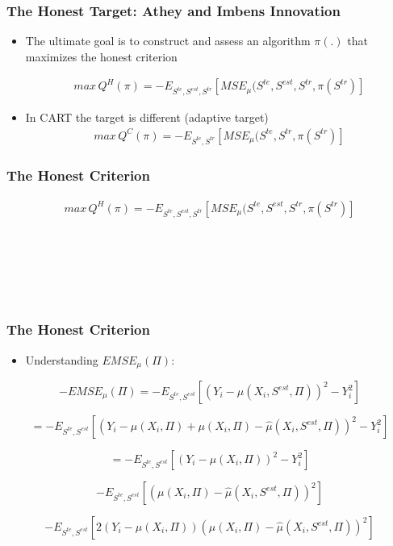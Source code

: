 \documentclass[
  shownotes,
  xcolor={svgnames},
  hyperref={colorlinks,citecolor=DarkBlue,linkcolor=DarkRed,urlcolor=DarkBlue}
  , aspectratio=169]{beamer}
\begin{document}
\begin{frame}[fragile]
\frametitle{The Honest Target: Athey and Imbens Innovation}


\begin{itemize}
\item The ultimate goal is to construct and assess an algorithm $\pi(.)$ that maximizes the honest criterion

\medskip
\begin{align}
max\,Q^{H}(\pi)=-E_{S^{te},S^{est},S^{tr}}\left[MSE_{\mu}(S^{te},S^{est},S^{tr},\pi(S^{tr})\right]
\end{align}


\item In CART the target is different (adaptive target)
\medskip
\begin{align}
max\,Q^{C}(\pi)=-E_{S^{te},S^{tr}}\left[MSE_{\mu}(S^{te},S^{tr},\pi(S^{tr})\right]
\end{align}


\end{itemize}
\end{frame}
\begin{frame}[fragile]
\frametitle{The Honest Criterion}

\begin{align}
max\,Q^{H}(\pi)=-E_{S^{te},S^{est},S^{tr}}\left[MSE_{\mu}(S^{te},S^{est},S^{tr},\pi(S^{tr})\right]
\end{align}
\bigskip

$\,$ \\
\bigskip

$\,$\\
\bigskip

$\,$\\
\bigskip
\end{frame}
\begin{frame}[fragile]
\frametitle{The Honest Criterion}

\begin{itemize}
  \item Understanding $EMSE_{\mu}(\Pi)$:
\end{itemize}
\begin{equation}
-EMSE_{\mu}(\Pi)=-E_{S^{te},S^{est}}\left[\left(Y_{i}-\hat{\mu}(X_{i},S^{est},\Pi)\right)^{2}-Y_{i}^{2}\right]
\end{equation}

\[
=-E_{S^{te},S^{est}}\left[\left(Y_{i}-\mu(X_{i},\Pi)+\mu(X_{i},\Pi)-\hat{\mu}(X_{i},S^{est},\Pi)\right)^{2}-Y_{i}^{2}\right]
\]

\[
=-E_{S^{te},S^{est}}\left[\left(Y_{i}-\mu(X_{i},\Pi)\right)^{2}-Y_{i}^{2}\right]
\]

\[
-E_{S^{te},S^{est}}\left[\left(\mu(X_{i},\Pi)-\hat{\mu}(X_{i},S^{est},\Pi)\right)^{2}\right]
\]

\[
-E_{S^{te},S^{est}}\left[2\left(Y_{i}-\mu(X_{i},\Pi)\right)\left(\mu(X_{i},\Pi)-\hat{\mu}(X_{i},S^{est},\Pi)\right)^{2}\right]
\]

\end{frame}
\end{document}
